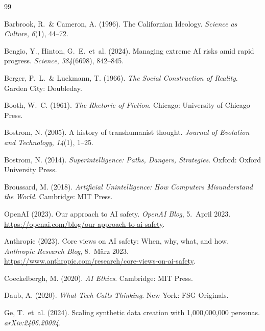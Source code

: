 \documentclass[12pt,a4paper]{article}
\begin{document}
\begin{thebibliography}{99}

  Barbrook, R.~\& Cameron, A. (1996).
  The Californian Ideology.
  \textit{Science as Culture}, \textit{6}(1), 44--72.

  Bengio, Y., Hinton, G.~E.~et~al. (2024).
  Managing extreme AI risks amid rapid progress.
  \textit{Science}, \textit{384}(6698), 842--845.

  Berger, P.~L.~\& Luckmann, T. (1966).
  \textit{The Social Construction of Reality}.
  Garden City: Doubleday.

  Booth, W.~C. (1961).
  \textit{The Rhetoric of Fiction}.
  Chicago: University of Chicago Press.

  Bostrom, N. (2005).
  A history of transhumanist thought.
  \textit{Journal of Evolution and Technology}, \textit{14}(1), 1--25.

  Bostrom, N. (2014).
  \textit{Superintelligence: Paths, Dangers, Strategies}.
  Oxford: Oxford University Press.

  Broussard, M. (2018).
  \textit{Artificial Unintelligence: How Computers Misunderstand the World}.
  Cambridge: MIT Press.

  OpenAI (2023).
  Our approach to AI safety.
  \textit{OpenAI Blog}, 5.~April 2023.
  \url{https://openai.com/blog/our-approach-to-ai-safety}.

  Anthropic (2023).
  Core views on AI safety: When, why, what, and how.
  \textit{Anthropic Research Blog}, 8.~M\"arz 2023.
  \url{https://www.anthropic.com/research/core-views-on-ai-safety}.

  Coeckelbergh, M. (2020).
  \textit{AI Ethics}.
  Cambridge: MIT Press.

  Daub, A. (2020).
  \textit{What Tech Calls Thinking}.
  New York: FSG Originals.

  Ge, T.~et~al. (2024).
  Scaling synthetic data creation with 1{,}000{,}000{,}000 personas.
  \textit{arXiv:2406.20094}.



\end{thebibliography}
\end{document}
